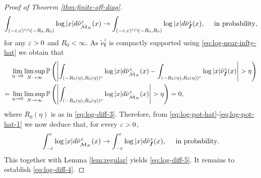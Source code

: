 \documentclass{amsart}
\numberwithin{equation}{section}
\def\corAB{}
\begin{document}
\begin{proof}[Proof of Theorem \ref{thm:finite-off-diag}]
{\begin{equation}\label{eq:log-pot-hat-1}
\int_{(-\vep, \vep)^c \cap (-R_0,R_0)} \log |x| d\tilde\nu^z_{\hat\model_N}(x) \to \int_{(-\vep, \vep)^c \cap (-R_0,R_0)} \log |x| d\corAB{\tilde\nu^z_{\bm f}}(x), \quad \text{ in probability}, 
\end{equation}
for any $\varepsilon >0$ and $R_0 < \infty$. As $\corAB{\tilde\nu^z_{\bm f}}$ is compactly supported using \eqref{eq:log-near-infty-hat} we obtain that
\begin{align*}
\, &\lim_{\eta \to 0} \limsup_{N \to \infty} \mathbb P\left( \left| \int_{(-R_0(\eta),R_0(\eta))^c}  \log |x| d \tilde\nu_{\hat {\mathcal{M}}_N}^z(x) - \int_{(-R_0(\eta),R_0(\eta))^c}  \log |x| \tilde\nu^z_{\bm f}(x)\right| > \eta\right) \\
=\, & \lim_{\eta \to 0} \limsup_{N \to \infty} \mathbb P\left( \left| \int_{(-R_0(\eta),R_0(\eta))^c}  \log |x| d \tilde\nu_{\hat {\mathcal{M}}_N}^z(x) \right| > \eta \right)=0,
\end{align*}
where $R_0(\eta)$ is as in \eqref{eq:log-diff-3}. Therefore, from \eqref{eq:log-pot-hat}-\eqref{eq:log-pot-hat-1} we now deduce that, for every $\varepsilon >0$,
\[
\int_{-\vep}^{\vep} \log|x| d\tilde\nu^z_{\hat\model_N}(x) \to \int_{-\vep}^{\vep} \log|x| d\corAB{\tilde\nu^z_{\bm f}}(x), \quad \text{ in probability}.
\]
This together with Lemma \ref{lem:regular} yields \eqref{eq:log-diff-5}. It remains to establish \eqref{eq:log-diff-4}.}




\end{proof}
\end{document}
